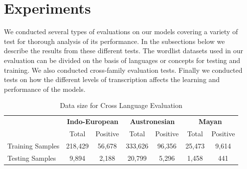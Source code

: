 \documentclass[11pt,letterpaper]{article}
\begin{document}
\section{Experiments}

We conducted several types of evaluations on our models covering a variety of test for thorough analysis of its performance. In the subsections below we describe the results from these different tests.
The wordlist datasets used in our evaluation can be divided on the basis of languages or concepts for testing and training. We also conducted cross-family evaluation tests. Finally we conducted tests on how the different levels of transcription affects the learning and performance of the models.

\begin{table}[t]
\centering
\begin{tabular}{lcccccc}
\multicolumn{1}{c}{\textbf{}} & \multicolumn{2}{c}{\textbf{Indo-European}} & \multicolumn{2}{c}{\textbf{Austronesian}} & \multicolumn{2}{c}{\textbf{Mayan}} \\
\multicolumn{1}{c}{}          & Total               & Positive             & Total               & Positive            & Total           & Positive         \\
Training Samples              & 218,429             & 56,678               & 333,626             & 96,356              & 25,473          & 9,614            \\
Testing Samples               & 9,894               & 2,188                & 20,799              & 5,296               & 1,458           & 441             
\end{tabular}
\caption{Data size for Cross Language Evaluation}
\label{CL_count}
\end{table}
\end{document}

